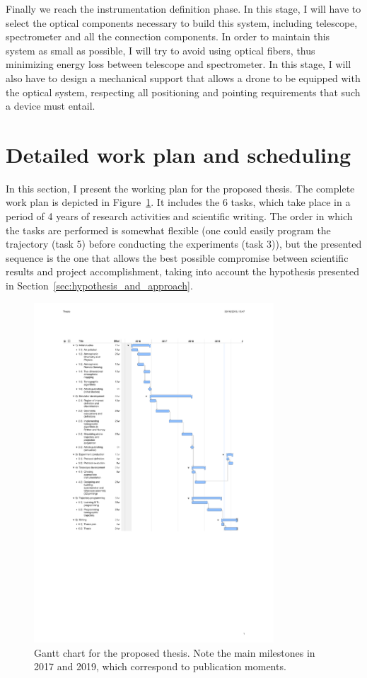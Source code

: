 Finally we reach the instrumentation definition phase. In this stage, I
will have to select the optical components necessary to build this
system, including telescope, spectrometer and all the connection
components. In order to maintain this system as small as possible, I
will try to avoid using optical fibers, thus minimizing energy loss
between telescope and spectrometer. In this stage, I will also have to
design a mechanical support that allows a drone to be equipped with the
optical system, respecting all positioning and pointing requirements
that such a device must entail.

\section{Detailed work plan and scheduling}%
\label{sec:detailed_work_plan_and_scheduling}

In this section, I present the working plan for the proposed thesis. The
complete work plan is depicted in Figure~\ref{fig:low_res_gantt}. It
includes the 6 tasks, which take place in a period of 4 years of
research activities and scientific writing. The order in which the tasks
are performed is somewhat flexible (one could easily program the
trajectory (task 5) before conducting the experiments (task 3)), but the
presented sequence is the one that allows the best possible compromise
between scientific results and project accomplishment, taking into
account the hypothesis presented in
Section~\ref{sec:hypothesis_and_approach}.

\begin{figure}[htpb]
    \centering
    \includegraphics[width=0.8\textwidth]{img/gantt.pdf}
    \caption{Gantt chart for the proposed thesis. Note the main
    milestones in 2017 and 2019, which correspond to publication
    moments.}
    \label{fig:low_res_gantt}
\end{figure}

